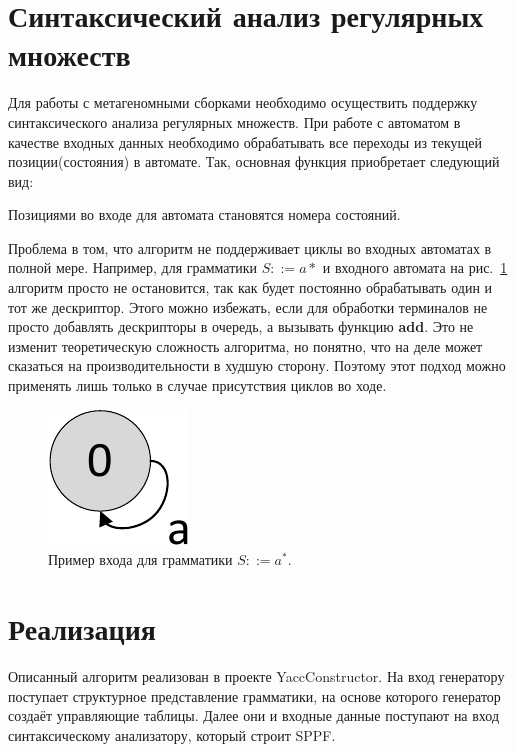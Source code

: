 \documentclass[14pt]{matmex-diploma-custom}
\begin{document}
	
	
	
	
	
	
    
    
    \section{Синтаксический анализ регулярных множеств}
    Для работы с метагеномными сборками необходимо осуществить поддержку синтаксического анализа регулярных множеств.
    При работе с автоматом в качестве входных данных необходимо обрабатывать все переходы из текущей позиции(состояния) в автомате.
    Так, основная функция приобретает следующий вид:
    
    Позициями во входе для автомата становятся номера состояний. 
    
    Проблема в том, что алгоритм не поддерживает
    циклы во входных автоматах в полной мере. Например, для грамматики $S ::= a*$ и входного автомата на рис.~\ref{graphEx}
    алгоритм просто не остановится, так как будет постоянно обрабатывать один и тот же дескриптор.
    Этого можно избежать, если для обработки терминалов не просто добавлять дескрипторы в очередь, а вызывать функцию \textbf{add}.
    Это не изменит теоретическую сложность алгоритма, но понятно, что на деле может сказаться на производительности в худшую сторону.
    Поэтому этот подход можно применять лишь только в случае присутствия циклов во ходе.
    \begin{figure}[ht]   
        \centering
        \includegraphics[scale=.5]{pictures/graphEx.pdf}
        \caption{Пример входа для грамматики $S ::= a^*$.}
        \label{graphEx}
    \end{figure}

    \section{Реализация}
    
    Описанный алгоритм реализован в проекте YaccConstructor. 
    На вход генератору поступает структурное представление грамматики, на основе которого 
    генератор создаёт управляющие таблицы. Далее они и входные данные поступают на вход
    синтаксическому анализатору, который строит SPPF. 
    
\end{document}
